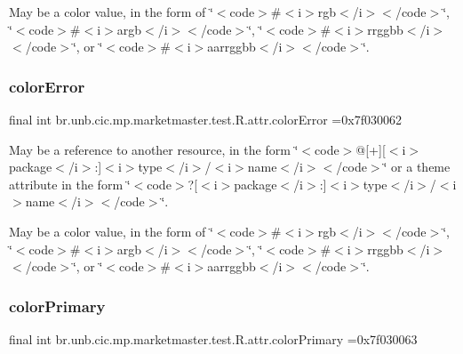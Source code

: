 May be a color value, in the form of \char`\"{}$<$code$>$\#$<$i$>$rgb$<$/i$>$$<$/code$>$\char`\"{}, \char`\"{}$<$code$>$\#$<$i$>$argb$<$/i$>$$<$/code$>$\char`\"{}, \char`\"{}$<$code$>$\#$<$i$>$rrggbb$<$/i$>$$<$/code$>$\char`\"{}, or \char`\"{}$<$code$>$\#$<$i$>$aarrggbb$<$/i$>$$<$/code$>$\char`\"{}. \mbox{\label{classbr_1_1unb_1_1cic_1_1mp_1_1marketmaster_1_1test_1_1R_1_1attr_ac264e1732dbaa4af8d2897d297a1b085}} 
\subsubsection{\texorpdfstring{color\+Error}{colorError}}
{\footnotesize\ttfamily final int br.\+unb.\+cic.\+mp.\+marketmaster.\+test.\+R.\+attr.\+color\+Error =0x7f030062\hspace{0.3cm}{\ttfamily [static]}}

May be a reference to another resource, in the form \char`\"{}$<$code$>$@\mbox{[}+\mbox{]}\mbox{[}$<$i$>$package$<$/i$>$\+:\mbox{]}$<$i$>$type$<$/i$>$/$<$i$>$name$<$/i$>$$<$/code$>$\char`\"{} or a theme attribute in the form \char`\"{}$<$code$>$?\mbox{[}$<$i$>$package$<$/i$>$\+:\mbox{]}$<$i$>$type$<$/i$>$/$<$i$>$name$<$/i$>$$<$/code$>$\char`\"{}. 

May be a color value, in the form of \char`\"{}$<$code$>$\#$<$i$>$rgb$<$/i$>$$<$/code$>$\char`\"{}, \char`\"{}$<$code$>$\#$<$i$>$argb$<$/i$>$$<$/code$>$\char`\"{}, \char`\"{}$<$code$>$\#$<$i$>$rrggbb$<$/i$>$$<$/code$>$\char`\"{}, or \char`\"{}$<$code$>$\#$<$i$>$aarrggbb$<$/i$>$$<$/code$>$\char`\"{}. \mbox{\label{classbr_1_1unb_1_1cic_1_1mp_1_1marketmaster_1_1test_1_1R_1_1attr_a5b5b64454e4e9230180a8a0b1291dbee}} 
\subsubsection{\texorpdfstring{color\+Primary}{colorPrimary}}
{\footnotesize\ttfamily final int br.\+unb.\+cic.\+mp.\+marketmaster.\+test.\+R.\+attr.\+color\+Primary =0x7f030063\hspace{0.3cm}{\ttfamily [static]}}

